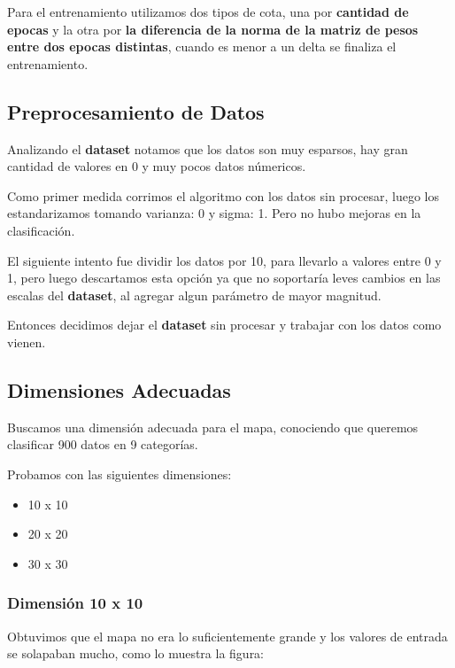Para el entrenamiento utilizamos dos tipos de cota, una por \textbf{cantidad
de epocas} y la otra por \textbf{la diferencia de la norma de la matriz de pesos
entre dos epocas distintas}, cuando es menor a un delta se finaliza 
el entrenamiento.


\subsection{Preprocesamiento de Datos}

Analizando el \textbf{dataset} notamos que los datos son muy esparsos, hay gran cantidad
de valores en 0 y muy pocos datos númericos.

Como primer medida corrimos el algoritmo con los datos sin procesar, luego
los estandarizamos tomando varianza: 0 y sigma: 1. Pero no hubo mejoras en la
clasificación.

El siguiente intento fue dividir los datos por 10, para llevarlo a valores entre
0 y 1, pero luego descartamos esta opción ya que no soportaría leves cambios 
en las escalas del \textbf{dataset}, al agregar algun parámetro de mayor magnitud.

Entonces decidimos dejar el \textbf{dataset} sin procesar y trabajar con los datos como
vienen.


\subsection{Dimensiones Adecuadas}

Buscamos una dimensión adecuada para el mapa, conociendo que queremos
clasificar 900 datos en 9 categorías.

Probamos con las siguientes dimensiones:

\begin{itemize}
	\item 10 x 10
	\item 20 x 20
	\item 30 x 30
\end{itemize}

\subsubsection{Dimensión 10 x 10 }

Obtuvimos que el mapa no era lo suficientemente grande y los valores de
entrada se solapaban mucho, como lo muestra la figura:

